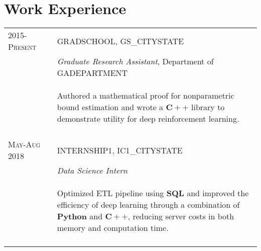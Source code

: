 \documentclass[a4paper,10pt]{article}
\begin{document}
\section{Work Experience}
\begin{supertabular}{l p{0.55cm} p{13.9cm}}
	\textsc{2015-Present}				&& \textsc{GRADSCHOOL}, GS_CITYSTATE \\
	\small\textsc{}							&& \small	\emph{Graduate Research Assistant}, \small Department of GADEPARTMENT \\
															&& \begin{enumerate*}[label =$\circ$,itemjoin={\newline}]
																	\item \footnotesize Authored a mathematical proof for nonparametric bound estimation and wrote a $\mathbf{C++}$ library to demonstrate utility for deep reinforcement learning. \end{enumerate*} \\ 

	 \\

	\textsc{May-Aug 2018}	&& \textsc{INTERNSHIP1}, IC1_CITYSTATE \\
												&& \small	\emph{Data Science Intern} \\
												&& \begin{enumerate*}[label =$\circ$, itemjoin={\newline}]
														\item \footnotesize Optimized ETL pipeline using $\mathbf{SQL}$ and improved the efficiency of deep learning through a combination of $\mathbf{Python}$ and $\mathbf{C++}$, reducing server costs in both memory and computation time.\end{enumerate*} \\
	 \\
	




\end{supertabular}
\end{document}

